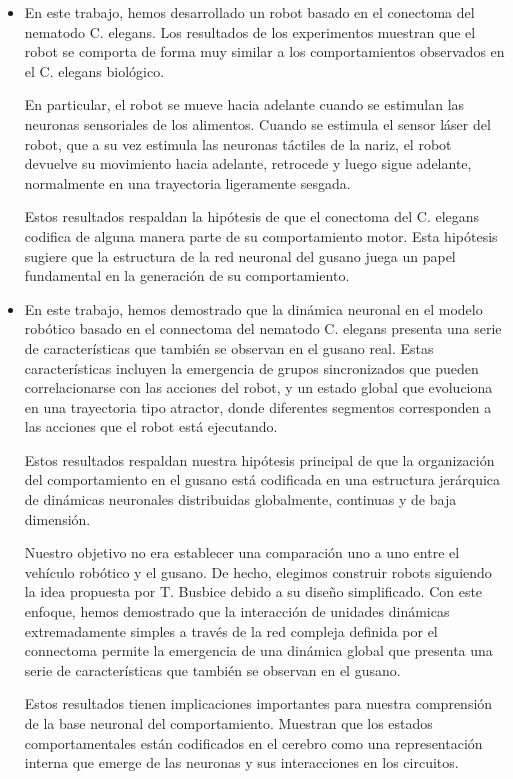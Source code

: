\begin{itemize}
	
	\item En este trabajo, hemos desarrollado un robot basado en el conectoma del
	nematodo C. elegans. Los resultados de los experimentos muestran que el robot se
	comporta de forma muy similar a los comportamientos observados en el C. elegans
	biológico.
	
	En particular, el robot se mueve hacia adelante cuando se estimulan las neuronas
	sensoriales de los alimentos. Cuando se estimula el sensor láser del robot, que
	a su vez estimula las neuronas táctiles de la nariz, el robot devuelve su
	movimiento hacia adelante, retrocede y luego sigue adelante, normalmente en una
	trayectoria ligeramente sesgada.
	
	Estos resultados respaldan la hipótesis de que el conectoma del C. elegans
	codifica de alguna manera parte de su comportamiento motor. Esta hipótesis
	sugiere que la estructura de la red neuronal del gusano juega un papel
	fundamental en la generación de su comportamiento.
	
	\item  En este trabajo, hemos demostrado que la dinámica neuronal en el modelo
	robótico basado en el connectoma del nematodo C. elegans presenta una serie de
	características que también se observan en el gusano real. Estas características
	incluyen la emergencia de grupos sincronizados que pueden correlacionarse con
	las acciones del robot, y un estado global que evoluciona en una trayectoria
	tipo atractor, donde diferentes segmentos corresponden a las acciones que el
	robot está ejecutando.
	
	Estos resultados respaldan nuestra hipótesis principal de que la organización
	del comportamiento en el gusano está codificada en una estructura jerárquica de
	dinámicas neuronales distribuidas globalmente, continuas y de baja dimensión.
	
	Nuestro objetivo no era establecer una comparación uno a uno entre el vehículo
	robótico y el gusano. De hecho, elegimos construir robots siguiendo la idea
	propuesta por T. Busbice debido a su diseño simplificado. Con este enfoque,
	hemos demostrado que la interacción de unidades dinámicas extremadamente simples
	a través de la red compleja definida por el connectoma permite la emergencia de
	una dinámica global que presenta una serie de características que también se
	observan en el gusano.
	
	Estos resultados tienen implicaciones importantes para nuestra comprensión de la
	base neuronal del comportamiento. Muestran que los estados comportamentales
	están codificados en el cerebro como una representación interna que emerge de
	las neuronas y sus interacciones en los circuitos.
	

\end{itemize}
